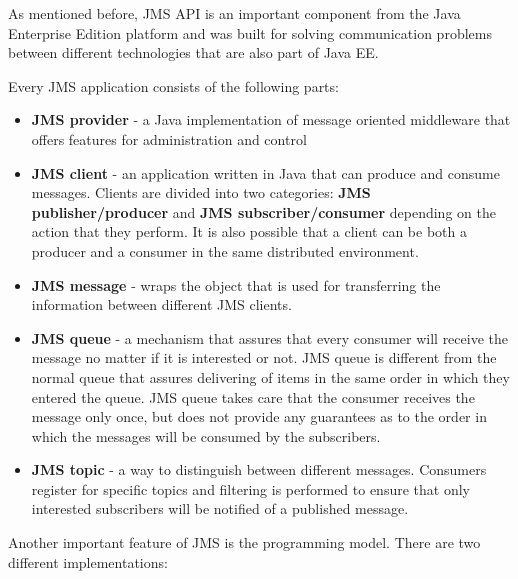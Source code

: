 \documentclass{sigplanconf}
\begin{document}
As mentioned before, JMS API is an important component from the Java Enterprise Edition platform and was built for solving communication problems between different technologies that are also part of Java EE.
	
Every JMS application consists of the following parts:

\begin{itemize} \itemsep1pt \parskip0pt 

\item \textbf{JMS provider} - a Java implementation of message oriented middleware that offers features for administration and control
\item \textbf{JMS client} - an application written in Java that can produce and consume messages. Clients are divided into two categories: \textbf{JMS publisher/producer} and \textbf{JMS subscriber/consumer} depending on the action that they perform. It is also possible that a client can be both a producer and a consumer in the same distributed environment.
\item \textbf{JMS message} - wraps the object that is used for transferring the information between different JMS clients.
\item \textbf{JMS queue} - a mechanism that assures that every consumer will receive the message no matter if it is interested or not. JMS queue is different from the normal queue that assures delivering of items in the same order in which they entered the queue. JMS queue takes care that the consumer receives the message only once, but does not provide any guarantees as to the order in which the messages will be consumed by the subscribers.
\item \textbf{JMS topic} - a way to distinguish between different messages. Consumers register for specific topics and  filtering is performed to ensure that only interested subscribers will be notified of a published message.

\end{itemize}

Another important feature of JMS is the programming model. There are two different implementations:
\end{document}
